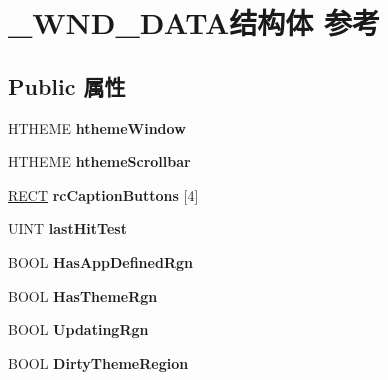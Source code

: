 \hypertarget{struct___w_n_d___d_a_t_a}{}\section{\+\_\+\+W\+N\+D\+\_\+\+D\+A\+T\+A结构体 参考}
\label{struct___w_n_d___d_a_t_a}
\subsection*{Public 属性}
\begin{DoxyCompactItemize}
\item 
\mbox{\label{struct___w_n_d___d_a_t_a_a19fb1116ac445ddcfdebcc6ebfeb5381}} 
H\+T\+H\+E\+ME {\bfseries htheme\+Window}
\item 
\mbox{\label{struct___w_n_d___d_a_t_a_ab90d35800fd37b0b5418f92f50fdc373}} 
H\+T\+H\+E\+ME {\bfseries htheme\+Scrollbar}
\item 
\mbox{\label{struct___w_n_d___d_a_t_a_a37113934b607ce6ad9c5162913a53a81}} 
\hyperlink{structtag_r_e_c_t}{R\+E\+CT} {\bfseries rc\+Caption\+Buttons} \mbox{[}4\mbox{]}
\item 
\mbox{\label{struct___w_n_d___d_a_t_a_aa8df60a0f21c5f8566424c13942b1ad0}} 
U\+I\+NT {\bfseries last\+Hit\+Test}
\item 
\mbox{\label{struct___w_n_d___d_a_t_a_af7e2d7d83e9f8115b10f9ab737a8ce58}} 
B\+O\+OL {\bfseries Has\+App\+Defined\+Rgn}
\item 
\mbox{\label{struct___w_n_d___d_a_t_a_a987310f7d1c2ed9274d9c20ba758a7ea}} 
B\+O\+OL {\bfseries Has\+Theme\+Rgn}
\item 
\mbox{\label{struct___w_n_d___d_a_t_a_a1b2c8a0ff5fdabead96ba0b587757f64}} 
B\+O\+OL {\bfseries Updating\+Rgn}
\item 
\mbox{\label{struct___w_n_d___d_a_t_a_a1770758e3b693686d06e55b6a43bcc7a}} 
B\+O\+OL {\bfseries Dirty\+Theme\+Region}
\item 
\mbox{\label{struct___w_n_d___d_a_t_a_a4a5e30b947fceab6a235a0a140497fdb}} 

\end{DoxyCompactItemize}

